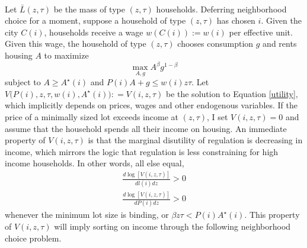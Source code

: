\documentclass[]{article}
\begin{document}
\paragraph*{}
Let $\bar{L}(z, \tau)$ be the mass of type $(z, \tau)$ households. Deferring neighborhood choice for a moment, suppose a household of type $(z, \tau)$ has chosen $i$.  Given the city $C(i)$, households receive a wage $w(C(i)) := w(i)$ per effective unit. Given this wage, the household of type $(z, \tau)$ chooses consumption $g$ and rents housing $A$ to maximize
\begin{equation}\label{utility}
	\max_{A, g} A^{\beta}g^{1-\beta}
\end{equation} 
subject to $A \geq A^{\star}(i)$ and $P(i)A + g \leq w(i)z\tau$. Let  $V\big(P(i), z, \tau, w(i), A^{\star}(i)\big) : = V(i, z,\tau)$ be the solution to Equation \eqref{utility}, which implicitly depends on prices, wages and other endogenous variables. If the price of a minimally sized lot exceeds income at $(z, \tau)$, I set  $V(i, z,\tau) = 0$ and assume that the household spends all their income on housing. An immediate property of $V(i, z, \tau)$ is that the marginal disutility of regulation is decreasing in income, which mirrors the logic that regulation is less constraining for high income households. In other words, all else equal,
\begin{eqnarray*}
	\frac{d\log[V(i, z, \tau)]}{dl(i)dz} > 0  \\ \frac{d\log[V(i, z, \tau)]}{dP(i)dz} > 0	
\end{eqnarray*}
whenever the minimum lot size is binding, or $\beta z\tau < P(i)A^{\star}(i)$. This property of $V(i, z, \tau)$ will imply sorting on income through the following neighborhood choice problem. 
\end{document}
